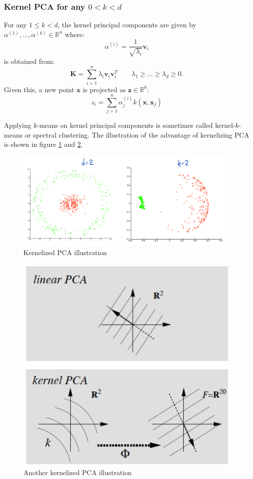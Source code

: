 \documentclass[a4paper,10pt,twoside]{article}
\begin{document}
\subsubsection{Kernel PCA for any $0<k<d$}

For any $1\leq k<d$, the kernel principal components are given by $\alpha^{(1)},\ldots, \alpha^{(k)}\in\mathbb{R}^n$ where:
\begin{equation*}
    \alpha^{(i)}=\frac{1}{\sqrt{\lambda_i}}\mathbf{v}_i
\end{equation*}
is obtained from:
\begin{equation}
    \mathbf{K}=\sum_{i=1}^{n}\lambda_i\mathbf{v}_i\mathbf{v}_i^T\qquad\lambda_1\geq\ldots\geq\lambda_d\geq 0.
\end{equation}
Given this, a new point $\mathbf{x}$ is projected as $\mathbf{z}\in\mathbb{R}^k$:
\begin{equation*}
    z_i=\sum_{j=1}^{n}\alpha_j^{(i)}k(\mathbf{x}, \mathbf{x}_j)
\end{equation*}

Applying $k$-means on kernel principal components is sometimes called kernel-$k$-means or spectral clustering. The illustration of the advantage of kernelizing PCA is shown in figure \ref{kernelized_pca} and \ref{kernerlized_pca_2}.

\begin{figure}
    \centering
    \includegraphics[width=.5\textwidth]{figures/kernelized_pca.png}
    \caption{Kernelized PCA illustration}
    \label{kernelized_pca}
\end{figure}

\begin{figure}
    \centering
    \includegraphics[width=.5\textwidth]{figures/kernerlized_pca_2}
    \caption{Another kernelized PCA illustration}
    \label{kernerlized_pca_2}
\end{figure}
\end{document}
